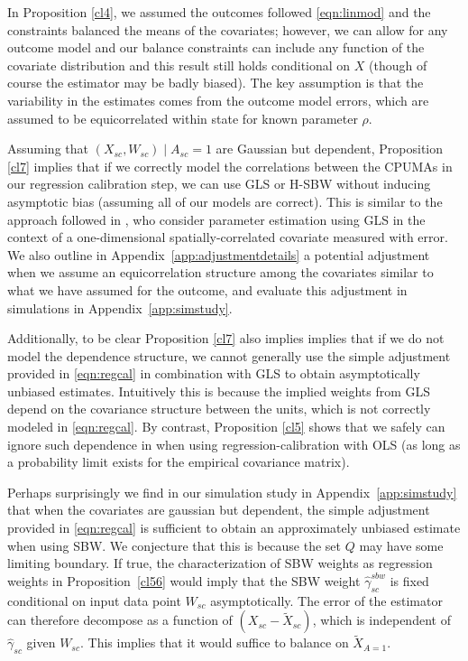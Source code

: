 \begin{remark}
    In Proposition \ref{cl4}, we assumed the outcomes followed \eqref{eqn:linmod} and the constraints balanced the means of the covariates; however, we can allow for any outcome model and our balance constraints can include any function of the covariate distribution and this result still holds conditional on $X$ (though of course the estimator may be badly biased). The key assumption is that the variability in the estimates comes from the outcome model errors, which are assumed to be equicorrelated within state for known parameter $\rho$.
\end{remark}

\begin{remark}
    Assuming that $(X_{sc}, W_{sc}) \mid A_{sc} = 1$ are Gaussian but dependent, Proposition \ref{cl7} implies that if we correctly model the correlations between the CPUMAs in our regression calibration step, we can use GLS or H-SBW without inducing asymptotic bias (assuming all of our models are correct). This is similar to the approach followed in \cite{huque2014impact}, who consider parameter estimation using GLS in the context of a one-dimensional spatially-correlated covariate measured with error. We also outline in Appendix~\ref{app:adjustmentdetails} a potential adjustment when we assume an equicorrelation structure among the covariates similar to what we have assumed for the outcome, and evaluate this adjustment in simulations in Appendix~\ref{app:simstudy}. 
    
    Additionally, to be clear Proposition \ref{cl7} also implies implies that if we do not model the dependence structure, we cannot generally use the simple adjustment provided in \eqref{eqn:regcal} in combination with GLS to obtain asymptotically unbiased estimates. Intuitively this is because the implied weights from GLS depend on the covariance structure between the units, which is not correctly modeled in \eqref{eqn:regcal}. By contrast, Proposition \ref{cl5} shows that we safely can ignore such dependence in when using regression-calibration with OLS (as long as a probability limit exists for the empirical covariance matrix).
\end{remark}

\begin{remark}
    Perhaps surprisingly we find in our simulation study in Appendix~\ref{app:simstudy} that when the covariates are gaussian but dependent, the simple adjustment provided in \eqref{eqn:regcal} is sufficient to obtain an approximately unbiased estimate when using SBW. We conjecture that this is because the set $Q$ may have some limiting boundary. If true, the characterization of SBW weights as regression weights in Proposition~\ref{cl56} would imply that the SBW weight $\hat{\gamma}_{sc}^{sbw}$ is fixed conditional on input data point $W_{sc}$ asymptotically. 
    The error of the estimator can therefore decompose as a function of $(X_{sc} - \tilde{X}_{sc})$, which is independent of $\hat{\gamma}_{sc}$ given $W_{sc}$. This implies that it would suffice to balance on $\tilde{X}_{A=1}$.
\end{remark}


